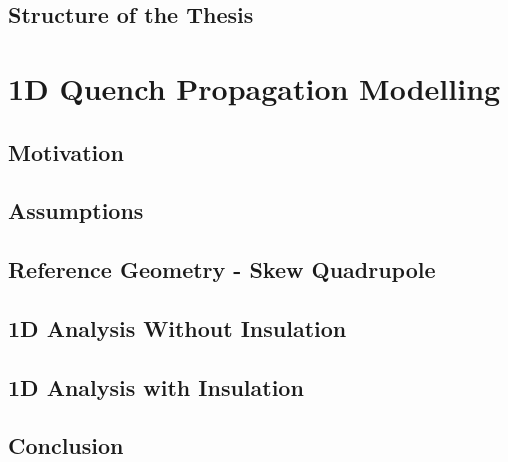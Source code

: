 \documentclass[11pt,a4paper]{report}
\begin{document}
\section{Structure of the Thesis}


\clearpage
\chapter{1D Quench Propagation Modelling}
\label{chapter: 1d_quench_propagation_modelling}

\section{Motivation}
\label{section: 1d_quench_propagation_motivation}


\section{Assumptions}
\label{section: 1d_quench_propagation_assumptions}


\section{Reference Geometry - Skew Quadrupole}
\label{section: 1d_quench_propagation_geometry}


\section{1D Analysis Without Insulation}

\label{section: 1D_quench_propagation_no_insulation}


\section{1D Analysis with Insulation}

\label{section: 1D_quench_propagation_with_insulation}


\section{Conclusion}
\label{section: 1D_quench_propagation_conclusions}

 
\end{document}
